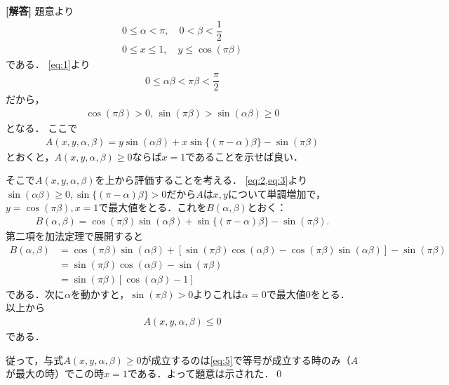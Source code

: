 \documentclass[../../main.tex]{subfiles}
\begin{document}
\begin{oframed}
  
\end{oframed}

{\bf [解答]}
題意より
\begin{align}
  0 \le \alpha < \pi, \quad 0 < \beta < \dfrac{1}{2} \label{eq:1} \\
  0 \le x \le 1, \quad y \le \cos(\pi\beta) \label{eq:2}
\end{align}
である．
\cref{eq:1}より
\begin{align}
  0 \le \alpha\beta < \pi\beta < \dfrac{\pi}{2}
\end{align}
だから，
\begin{align}
  \cos(\pi\beta) > 0, \, \sin(\pi\beta) > \sin(\alpha\beta) \ge 0 \label{eq:3}
\end{align}
となる．
ここで
\begin{align}
  A(x,y,\alpha,\beta)
  = y \sin(\alpha\beta) + x \sin\{(\pi-\alpha)\beta\} - \sin(\pi\beta)\label{eq:4}
\end{align}
とおくと，$A(x,y,\alpha,\beta) \ge 0$ならば$x=1$であることを示せば良い．

そこで$A(x,y,\alpha,\beta)$を上から評価することを考える．
\cref{eq:2,eq:3}より$\sin(\alpha\beta) \ge 0, \sin\{(\pi-\alpha)\beta\}>0$だから$A$は$x,y$について単調増加で，$y=\cos(\pi\beta), x=1$で最大値をとる．これを$B(\alpha,\beta)$とおく：
\begin{align}
  B(\alpha,\beta) = \cos(\pi\beta) \sin(\alpha\beta) + \sin\{(\pi-\alpha)\beta\} - \sin(\pi\beta).
\end{align}
第二項を加法定理で展開すると
\begin{align}
  B(\alpha,\beta)
  & = \cos(\pi\beta) \sin(\alpha\beta)
  + \left[\sin(\pi\beta)\cos(\alpha\beta) - \cos(\pi\beta)\sin(\alpha\beta)\right]  - \sin(\pi\beta)  \\
  & = \sin(\pi\beta)\cos(\alpha\beta) - \sin(\pi\beta) \\
  & = \sin(\pi\beta)\left[\cos(\alpha\beta) - 1\right]
\end{align}
である．次に$\alpha$を動かすと，$\sin(\pi\beta)>0$よりこれは$\alpha=0$で最大値$0$をとる．以上から
\begin{align}
  A(x,y,\alpha,\beta) \le 0 \label{eq:5}
\end{align}
である．

従って，与式$A(x,y,\alpha,\beta) \ge 0$が成立するのは\cref{eq:5}で等号が成立する時のみ（$A$が最大の時）でこの時$x=1$である．よって題意は示された．\qed

\newpage
\end{document}
